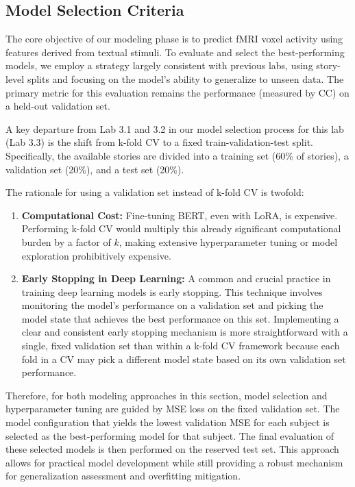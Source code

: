 \documentclass[10pt,letterpaper]{article}
\begin{document}
\subsection{Model Selection Criteria}

The core objective of our modeling phase is to predict fMRI voxel activity using features derived from textual stimuli. To evaluate and select the best-performing models, we employ a strategy largely consistent with previous labs, using story-level splits and focusing on the model's ability to generalize to unseen data. The primary metric for this evaluation remains the performance (measured by CC) on a held-out validation set.

A key departure from Lab 3.1 and 3.2 in our model selection process for this lab (Lab 3.3) is the shift from k-fold CV to a fixed train-validation-test split. Specifically, the available stories are divided into a training set (60\% of stories), a validation set (20\%), and a test set (20\%).

The rationale for using a validation set instead of k-fold CV is twofold:
\begin{enumerate}
    \item \textbf{Computational Cost:} Fine-tuning BERT, even with LoRA, is expensive. Performing k-fold CV would multiply this already significant computational burden by a factor of $k$, making extensive hyperparameter tuning or model exploration prohibitively expensive.
    \item \textbf{Early Stopping in Deep Learning:} A common and crucial practice in training deep learning models is early stopping. This technique involves monitoring the model's performance on a validation set and picking the model state that achieves the best performance on this set. Implementing a clear and consistent early stopping mechanism is more straightforward with a single, fixed validation set than within a k-fold CV framework because each fold in a CV may pick a different model state based on its own validation set performance.
\end{enumerate}

Therefore, for both modeling approaches in this section, model selection and hyperparameter tuning are guided by MSE loss on the fixed validation set. The model configuration that yields the lowest validation MSE for each subject is selected as the best-performing model for that subject. The final evaluation of these selected models is then performed on the reserved test set. This approach allows for practical model development while still providing a robust mechanism for generalization assessment and overfitting mitigation.
\end{document}
